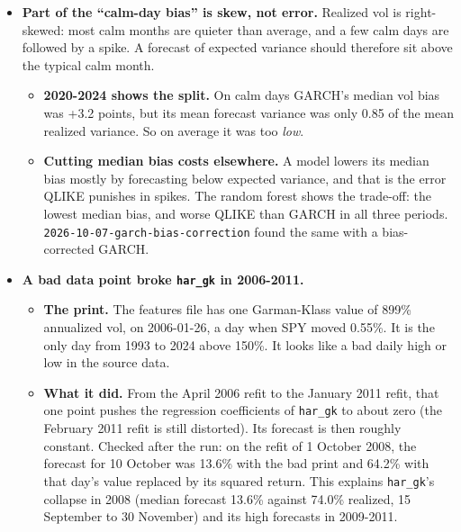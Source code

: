\documentclass{article}
\begin{document}
\begin{itemize}
\begin{itemize}
\end{itemize}

\item \textbf{Part of the ``calm-day bias'' is skew, not error.} Realized vol is right-skewed: most calm months are quieter than average, and a few calm days are followed by a spike. A forecast of expected variance should therefore sit above the typical calm month.

\begin{itemize}

\item \textbf{2020-2024 shows the split.} On calm days GARCH's median vol bias was +3.2 points, but its mean forecast variance was only 0.85 of the mean realized variance. So on average it was too \emph{low}.

\item \textbf{Cutting median bias costs elsewhere.} A model lowers its median bias mostly by forecasting below expected variance, and that is the error QLIKE punishes in spikes. The random forest shows the trade-off: the lowest median bias, and worse QLIKE than GARCH in all three periods. \texttt{2026-\allowbreak{}10-\allowbreak{}07-\allowbreak{}garch-\allowbreak{}bias-\allowbreak{}correction} found the same with a bias-corrected GARCH.

\end{itemize}

\item \textbf{A bad data point broke \texttt{har\_\allowbreak{}gk} in 2006-2011.}

\begin{itemize}

\item \textbf{The print.} The features file has one Garman-Klass value of 899\% annualized vol, on 2006-01-26, a day when SPY moved 0.55\%. It is the only day from 1993 to 2024 above 150\%. It looks like a bad daily high or low in the source data.

\item \textbf{What it did.} From the April 2006 refit to the January 2011 refit, that one point pushes the regression coefficients of \texttt{har\_\allowbreak{}gk} to about zero (the February 2011 refit is still distorted). Its forecast is then roughly constant. Checked after the run: on the refit of 1 October 2008, the forecast for 10 October was 13.6\% with the bad print and 64.2\% with that day's value replaced by its squared return. This explains \texttt{har\_\allowbreak{}gk}'s collapse in 2008 (median forecast 13.6\% against 74.0\% realized, 15 September to 30 November) and its high forecasts in 2009-2011.


\end{itemize}
\end{itemize}
\end{document}
